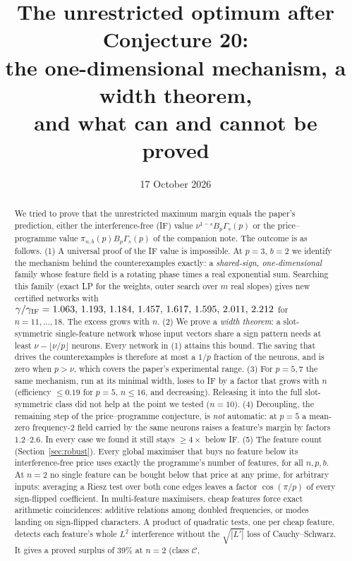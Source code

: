 \documentclass[11pt]{article}
\title{The unrestricted optimum after Conjecture 20:\\ the one-dimensional mechanism, a width theorem,\\ and what can and cannot be proved}
\author{}
\date{17 October 2026}
\theoremstyle{definition}
\begin{document}
\maketitle

\begin{abstract}
We tried to prove that the unrestricted maximum margin equals the paper's prediction, either the interference-free (IF) value
$\nu^{1-s}B_p\Gamma_s(p)$ or the price--programme value $\pi_{n,b}(p)B_p\Gamma_s(p)$ of the companion note.  The outcome is
as follows.
(1) A universal proof of the IF value is impossible.  At $p=3$, $b=2$ we identify the mechanism behind the counterexamples
exactly: a \emph{shared-sign, one-dimensional} family whose feature field is a rotating phase times a real exponential sum.
Searching this family (exact LP for the weights, outer search over $m$ real slopes) gives new certified networks with
$\gamma/\gamma_{\rm IF}=1.063,\,1.193,\,1.184,\,1.457,\,1.617,\,1.595,\,2.011,\,2.212$ for $n=11,\dots,18$.  The excess grows with $n$.
(2) We prove a \emph{width theorem}: a slot-symmetric single-feature network whose input vectors share a sign pattern needs
at least $\nu-\lfloor\nu/p\rfloor$ neurons.  Every network in (1) attains this bound.  The saving that drives the
counterexamples is therefore at most a $1/p$ fraction of the neurons, and is zero when $p>\nu$, which covers the paper's
experimental range.
(3) For $p=5,7$ the same mechanism, run at its minimal width, loses to IF by a factor that grows with $n$ (efficiency
$\le0.19$ for $p=5$, $n\le16$, and decreasing).  Releasing it into the full slot-symmetric class did not help at the point we tested ($n=10$).
(4) Decoupling, the remaining step of the price--programme conjecture, is \emph{not} automatic: at $p=5$ a mean-zero
frequency-2 field carried by the same neurons raises a feature's margin by factors $1.2$--$2.6$.  In every case we found
it still stays $\ge4\times$ below IF.
(5) The feature count (Section~\ref{sec:robust}).  Every global maximiser that buys no feature below its interference-free
price uses exactly the programme's number of features, for all $n,p,b$.  At $n=2$ no single feature can be bought below that price
at any prime, for arbitrary inputs: averaging a Riesz test over both cone edges leaves a factor $\cos(\pi/p)$ of every
sign-flipped coefficient.  In multi-feature maximisers, cheap features force exact arithmetic coincidences: additive relations
among doubled frequencies, or modes landing on sign-flipped characters.  A product of quadratic tests, one per cheap feature, detects each
feature's whole $L^2$ interference without the $\sqrt{|L'|}$ loss of Cauchy--Schwarz.  It gives a proved surplus of $39\%$ at $n=2$ (class $\mathcal C$,

\end{abstract}
\end{document}
